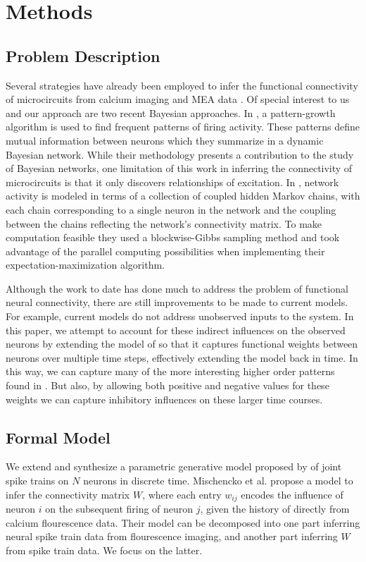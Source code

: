 \documentclass{article}
\begin{document}
\section{Methods}

\subsection{Problem Description}

Several strategies have already been employed to infer the functional
connectivity of microcircuits from calcium imaging and MEA data
\citep{Gerwinn2010, takahashi2007, aguiar2009}. Of special interest to us and our approach
are two recent Bayesian approaches. In \citep{patnaik2011}, 
a pattern-growth algorithm is used to find frequent patterns of firing 
activity. These patterns define mutual information between neurons
which they summarize in a dynamic Bayesian network. While their
methodology presents a contribution to the study of Bayesian networks,
one limitation of this work in inferring the connectivity of
microcircuits is that it only discovers relationships of excitation. In \citep{mishchencko2011}, network activity is modeled in terms of a collection of coupled hidden Markov chains, with each chain
corresponding to a single neuron in the network and the coupling
between the chains reflecting the network’s connectivity matrix.
To make computation feasible they used a blockwise-Gibbs sampling
method and took advantage of the parallel computing possibilities
when implementing their expectation-maximization algorithm. 

Although the work to date has done much to address the problem of
functional neural connectivity, there are still improvements to be
made to current models. For example, current models do not address
unobserved inputs to the system. In this paper, we attempt to account for these indirect influences on the observed neurons by extending the model of \citep{mishchencko2011} so that it captures functional weights between neurons over multiple time steps, effectively extending the model back in time. In this way, we can capture many of the more interesting higher order patterns found in \citep{patnaik2011}.  But also, by allowing both positive and negative values for these weights we can capture inhibitory influences on these larger time courses.

\subsection{Formal Model}
We extend and synthesize a parametric generative model proposed by
\citep{mishchencko2011} of joint spike trains on $N$ neurons in
discrete time. Mischencko
et al. propose a model to infer the connectivity matrix $W$, where
each entry $w_{ij}$ encodes the influence of neuron $i$ on the subsequent
firing of neuron $j$, given the history of directly from calcium
flourescence data. Their model can be decomposed into one part
inferring neural spike train data from flourescence imaging, and
another part inferring $W$ from spike train data. We focus on the
latter.
\end{document}
